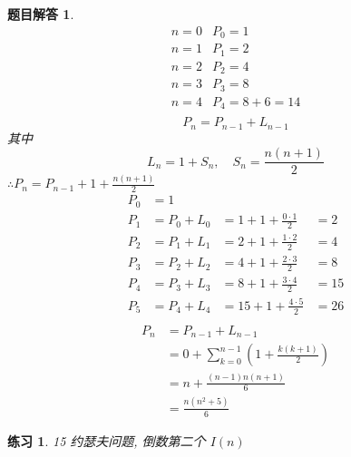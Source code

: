 \documentclass[mode=geye]{elegantnote}
\newtheorem{exercise}{练习}
\newtheorem{answer}{题目解答}
\begin{document}
\begin{answer}
	\begin{equation*}
		\begin{array}{ll}
			n=0	& P_0 = 1	\\
			n=1	& P_1 = 2	\\
			n=2 & P_2 = 4	\\
			n=3 & P_3 = 8	\\
			n=4 & P_4 = 8+6=14	\\
		\end{array}
	\end{equation*}
\begin{equation*}
	P_n = P_{n-1}+L_{n-1}
\end{equation*}
其中
\begin{equation*}
	L_n = 1+S_n,\quad S_n = \frac{n(n+1)}{2}
\end{equation*}
$ \therefore  P_n = P_{n-1}+1+\frac{n(n+1)}{2}$
\begin{equation*}
	\begin{array}{llll}
		P_0 &= 1 		& 							&		\\
		P_1 &= P_0+L_0 	&= 1+1+\frac{0\cdot 1 }{2} 	&= 2	\\ 
		P_2 &= P_1+L_1 	&= 2+1+\frac{1\cdot 2 }{2} 	&= 4	\\ 
		P_3 &= P_2+L_2 	&= 4+1+\frac{2\cdot 3 }{2} 	&= 8	\\ 
		P_4 &= P_3+L_3 	&= 8+1+\frac{3\cdot 4 }{2} 	&= 15	\\ 
		P_5 &= P_4+L_4 	&=15+1+\frac{4\cdot 5 }{2} 	&= 26	\\ 
	\end{array}
\end{equation*}
\begin{align*}
	P_n 
	&= P_{n-1}+L_{n-1} 		\\
	&= 0 + \sum_{k=0}^{n-1}\left(1+\frac{k(k+1)}{2}\right)	\\
	&= n + \frac{(n-1)n(n+1)}{6} \\
	&= \frac{n(n^2+5)}{6}
\end{align*}
\end{answer}

\begin{exercise}
	15 约瑟夫问题,  倒数第二个 $ I(n) $
\end{exercise}
\end{document}
